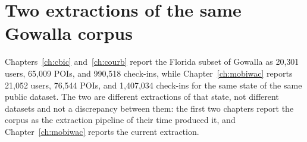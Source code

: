 


\section{Two extractions of the same Gowalla corpus}
\label{apx:errata:corpus}

Chapters~\ref{ch:cbic} and~\ref{ch:courb} report the Florida subset of Gowalla as
20{,}301 users, 65{,}009 POIs, and 990{,}518 check-ins, while Chapter~\ref{ch:mobiwac}
reports 21{,}052 users, 76{,}544 POIs, and 1{,}407{,}034 check-ins for the same state
of the same public dataset. The two are different extractions of that state, not
different datasets and not a discrepancy between them: the first two chapters report the
corpus as the extraction pipeline of their time produced it, and
Chapter~\ref{ch:mobiwac} reports the current extraction.

